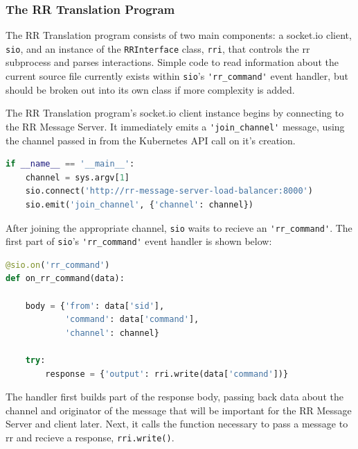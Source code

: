 \documentclass[12pt]{article}
\begin{document}
\subsubsection{The RR Translation Program} \label{joiningchannel}

The RR Translation program consists of two main components: a socket.io
client, \lstinline{sio}, and an instance of the
\lstinline{RRInterface} class, \lstinline{rri}, that controls the rr
subprocess and parses interactions.  Simple code to read information
about the current source file currently exists within
\lstinline{sio}'s \lstinline{'rr_command'} event handler, but should
be broken out into its own class if more complexity is added.
\par

The RR Translation program's socket.io client instance begins by
connecting to the RR Message Server.  It immediately emits a
\lstinline{'join_channel'} message, using the channel passed in from
the Kubernetes API call on it's creation. 

\begin{lstlisting}[language=Python,basicstyle=\linespread{0.5}\ttfamily,caption={RR Translation Main},captionpos=b]
if __name__ == '__main__':
    channel = sys.argv[1]
    sio.connect('http://rr-message-server-load-balancer:8000')
    sio.emit('join_channel', {'channel': channel})
\end{lstlisting}

After joining the appropriate channel, \lstinline{sio} waits to
recieve an \lstinline{'rr_command'}.  The first part of
\lstinline{sio}'s \lstinline{'rr_command'} event handler is shown below:

\begin{lstlisting}[language=Python,basicstyle=\linespread{0.5}\ttfamily,caption={RR Command Event Handler},captionpos=b]
@sio.on('rr_command')
def on_rr_command(data):

    body = {'from': data['sid'],
            'command': data['command'],
            'channel': channel}
    
    try:
        response = {'output': rri.write(data['command'])}
\end{lstlisting}

The handler first builds part of the response body, passing back data
about the channel and originator of the message that will be important
for the RR Message Server and client later.  Next, it calls the
function necessary to pass a message to rr and recieve a response,
\lstinline{rri.write()}.
\par
\end{document}
